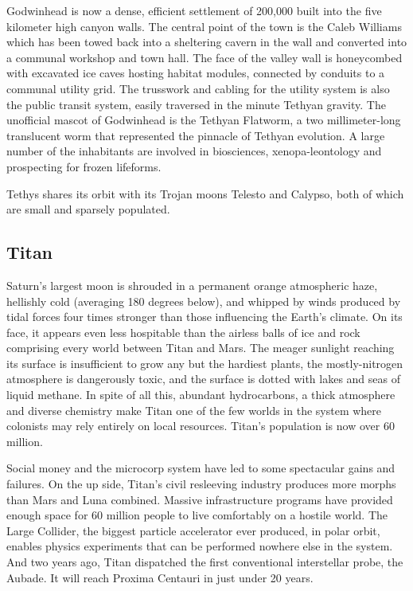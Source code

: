 Godwinhead is now a dense, efficient  settlement 
of 200,000 built into the five kilometer high canyon 
walls. The central point of the town is the Caleb Williams
which has been towed back into a sheltering
cavern in the wall and converted into a communal 
workshop and town hall. The face of the valley wall 
is honeycombed with excavated ice caves hosting 
habitat modules, connected by conduits to a communal
utility grid. The trusswork and cabling for the
utility system is also the public transit system, easily 
traversed in the minute Tethyan gravity. The unofficial 
mascot of Godwinhead is the Tethyan Flatworm, a 
two millimeter-long translucent worm that represented
the pinnacle of Tethyan evolution. A large number
of the inhabitants are involved in biosciences, xenopa-leontology
and prospecting for frozen lifeforms.

Tethys shares its orbit with its Trojan moons 
Telesto and Calypso, both of which are small and 
sparsely populated.

\subsection{Titan}

Saturn's largest moon is shrouded in a permanent 
orange atmospheric haze, hellishly cold (averaging 
180 degrees below), and whipped by winds produced 
by tidal forces four times stronger than those influencing
the Earth's climate. On its face, it appears even
less hospitable than the airless balls of ice and rock 
comprising every world between Titan and Mars. The 
meager sunlight reaching its surface is insufficient to 
grow any but the hardiest plants, the mostly-nitrogen 
atmosphere is dangerously toxic, and the surface 
is dotted with lakes and seas of liquid methane. In 
spite of all this, abundant hydrocarbons, a thick atmosphere
and diverse chemistry make Titan one of
the few worlds in the system where colonists may rely 
entirely on local resources. Titan's population is now 
over 60 million.

Social money and the microcorp system have led 
to some spectacular gains and failures. On the up 
side, Titan's civil resleeving industry produces more 
morphs than Mars and Luna combined. Massive 
infrastructure programs have provided enough space 
for 60 million people to live comfortably on a hostile 
world. The Large Collider, the biggest particle accelerator
ever produced, in polar orbit, enables physics
experiments that can be performed nowhere else in 
the system. And two years ago, Titan dispatched the 
first conventional interstellar probe, the Aubade. It 
will reach Proxima Centauri in just under 20 years.

